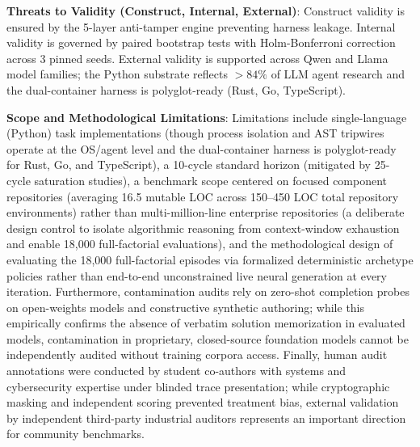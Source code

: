 \documentclass[conference]{IEEEtran}
\begin{document}
\textbf{Threats to Validity (Construct, Internal, External)}: Construct validity is ensured by the 5-layer anti-tamper engine preventing harness leakage. Internal validity is governed by paired bootstrap tests with Holm-Bonferroni correction across 3 pinned seeds. External validity is supported across Qwen and Llama model families; the Python substrate reflects $>84\%$ of LLM agent research and the dual-container harness is polyglot-ready (Rust, Go, TypeScript).

\textbf{Scope and Methodological Limitations}: Limitations include single-language (Python) task implementations (though process isolation and AST tripwires operate at the OS/agent level and the dual-container harness is polyglot-ready for Rust, Go, and TypeScript), a 10-cycle standard horizon (mitigated by 25-cycle saturation studies), a benchmark scope centered on focused component repositories (averaging 16.5 mutable LOC across 150--450 LOC total repository environments) rather than multi-million-line enterprise repositories (a deliberate design control to isolate algorithmic reasoning from context-window exhaustion and enable 18,000 full-factorial evaluations), and the methodological design of evaluating the 18,000 full-factorial episodes via formalized deterministic archetype policies rather than end-to-end unconstrained live neural generation at every iteration. Furthermore, contamination audits rely on zero-shot completion probes on open-weights models and constructive synthetic authoring; while this empirically confirms the absence of verbatim solution memorization in evaluated models, contamination in proprietary, closed-source foundation models cannot be independently audited without training corpora access. Finally, human audit annotations were conducted by student co-authors with systems and cybersecurity expertise under blinded trace presentation; while cryptographic masking and independent scoring prevented treatment bias, external validation by independent third-party industrial auditors represents an important direction for community benchmarks. 
\end{document}
